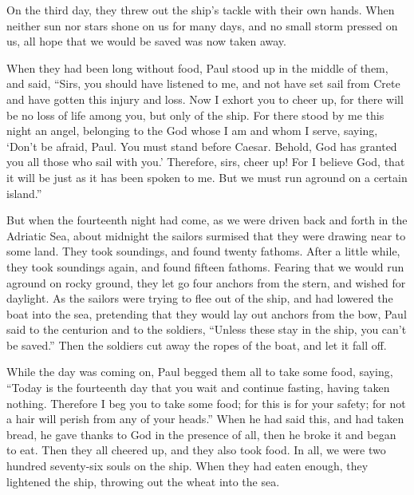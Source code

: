 {On the third day, they threw out the ship’s tackle with their own hands.
When neither sun nor stars shone on us for many days, and no small storm pressed on us, all hope that we would be saved was now taken away.
\par }{\PP {}When they had been long without food, Paul stood up in the middle of them, and said, “Sirs, you should have listened to me, and not have set sail from Crete and have gotten this injury and loss.
Now I exhort you to cheer up, for there will be no loss of life among you, but only of the ship.
For there stood by me this night an angel, belonging to the God whose I am and whom I serve,
saying, ‘Don’t be afraid, Paul. You must stand before Caesar. Behold, God has granted you all those who sail with you.’
Therefore, sirs, cheer up! For I believe God, that it will be just as it has been spoken to me.
But we must run aground on a certain island.”
\par }{\PP {}But when the fourteenth night had come, as we were driven back and forth in the Adriatic Sea, about midnight the sailors surmised that they were drawing near to some land.
They took soundings, and found twenty fathoms. After a little while, they took soundings again, and found fifteen fathoms.
Fearing that we would run aground on rocky ground, they let go four anchors from the stern, and wished for daylight.
As the sailors were trying to flee out of the ship, and had lowered the boat into the sea, pretending that they would lay out anchors from the bow,
Paul said to the centurion and to the soldiers, “Unless these stay in the ship, you can’t be saved.”
Then the soldiers cut away the ropes of the boat, and let it fall off.
\par }{\PP {}While the day was coming on, Paul begged them all to take some food, saying, “Today is the fourteenth day that you wait and continue fasting, having taken nothing.
Therefore I beg you to take some food; for this is for your safety; for not a hair will perish from any of your heads.”
When he had said this, and had taken bread, he gave thanks to God in the presence of all, then he broke it and began to eat.
Then they all cheered up, and they also took food.
In all, we were two hundred seventy-six souls on the ship.
When they had eaten enough, they lightened the ship, throwing out the wheat into the sea.
}
